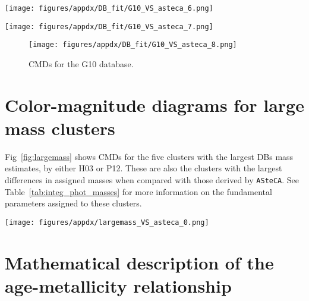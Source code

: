 \documentclass[referee]{aa}
\begin{document}
\begin{appendix}
\begin{figure*}
\texttt{[image: figures/appdx/DB\_fit/G10\_VS\_asteca\_6.png]}
\caption{CMDs for the G10 database.}
\label{fig:DBs_G10_6}
\end{figure*}
\clearpage

\begin{figure*}
\texttt{[image: figures/appdx/DB\_fit/G10\_VS\_asteca\_7.png]}
\caption{CMDs for the G10 database.}
\label{fig:DBs_G10_7}
\end{figure*}
\clearpage

\begin{figure}
\centering
\texttt{[image: figures/appdx/DB\_fit/G10\_VS\_asteca\_8.png]}
\caption{CMDs for the G10 database.}
\label{fig:DBs_G10_8}
\end{figure}




\section{Color-magnitude diagrams for large mass clusters}
\label{apdx:largemass}

Fig~\ref{fig:largemass} shows CMDs for the five clusters with the largest
DBs mass estimates, by either H03 or P12. These are also the clusters
with the largest differences in assigned masses when compared with those derived
by \texttt{ASteCA}.
See Table~\ref{tab:integ_phot_masses} for more information on the fundamental
parameters assigned to these clusters.

\begin{figure*}
\texttt{[image: figures/appdx/largemass\_VS\_asteca\_0.png]}
\caption{CMDs for the clusters with the largest masses assigned by H03 and/or
P12. The best match synthetic cluster is plotted to the right, and the observed
cluster region CMD to the left, for each cluster.}
\label{fig:largemass}
\end{figure*}





\section{Mathematical description of the age-metallicity relationship}
\label{apdx:amr_description}


\end{appendix}
\end{document}
